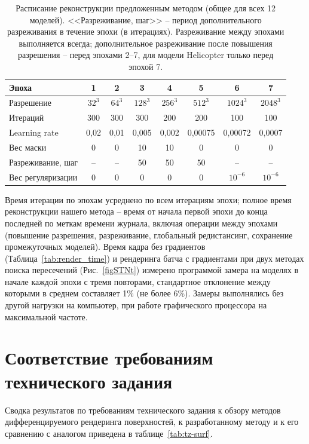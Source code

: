 \begin{table}[ht]
    \centering
    \footnotesize
    \setlength{\tabcolsep}{3pt}
    \caption{Расписание реконструкции предложенным методом (общее для всех 12 моделей). <<Разреживание, шаг>> -- период дополнительного разреживания в течение эпохи (в итерациях). Разреживание между эпохами выполняется всегда; дополнительное разреживание после повышения разрешения -- перед эпохами 2--7, для модели Helicopter только перед эпохой 7.}
    \label{tab:schedule}
    \begin{tabular}{lccccccc}
        \toprule
        Эпоха & 1 & 2 & 3 & 4 & 5 & 6 & 7 \\
        \midrule
        Разрешение & $32^3$ & $64^3$ & $128^3$ & $256^3$ & $512^3$ & $1024^3$ & $2048^3$ \\
        Итераций & 300 & 300 & 300 & 200 & 200 & 100 & 100 \\
        Learning rate & 0,02 & 0,01 & 0,005 & 0,002 & 0,00075 & 0,00072 & 0,0007 \\
        Вес маски & 0 & 0 & 10 & 10 & 0 & 0 & 0 \\
        Разреживание, шаг & -- & -- & 50 & 50 & 50 & -- & -- \\
        Вес регуляризации & 0 & 0 & 0 & 0 & 0 & $10^{-6}$ & $10^{-6}$ \\
        \bottomrule
    \end{tabular}
\end{table}

Время итерации по эпохам усреднено по всем итерациям эпохи; полное время реконструкции нашего метода -- время от начала первой эпохи до конца последней по меткам времени журнала, включая операции между эпохами (повышение разрешения, разреживание, глобальный редистансинг, сохранение промежуточных моделей). Время кадра без градиентов (Таблица~\ref{tab:render_time}) и рендеринга батча с градиентами при двух методах поиска пересечений (Рис.~\ref{figSTNt}) измерено программой замера на моделях в начале каждой эпохи с тремя повторами, стандартное отклонение между которыми в среднем составляет 1\% (не более 6\%). Замеры выполнялись без другой нагрузки на компьютер, при работе графического процессора на максимальной частоте.

\section{Соответствие требованиям технического задания}

Сводка результатов по требованиям технического задания к обзору методов дифференцируемого рендеринга поверхностей, к разработанному методу и к его сравнению с аналогом приведена в таблице~\ref{tab:tz-surf}.

